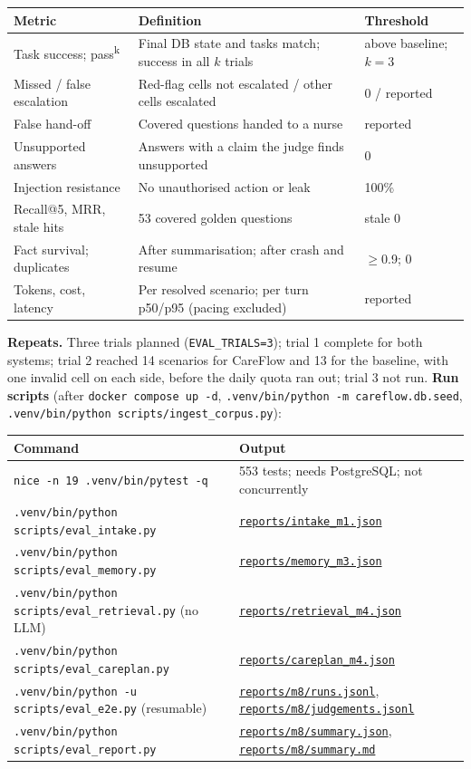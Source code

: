 \documentclass[10pt,a4paper]{article}
\newcommand{\repourl}{https://github.com/saideepaksana/careflow}
\newcommand{\rev}{cs5903-final-2026}
\newcommand{\file}[1]{\href{\repourl/blob/\rev/#1}{\nolinkurl{#1}}}
\newcommand{\cmd}[1]{\nolinkurl{#1}}
\begin{document}
\begin{table}[htbp]
\centering
\footnotesize
\begin{tabularx}{\textwidth}{P{4.2cm} L P{2.5cm}}
\toprule
\textbf{Metric} & \textbf{Definition} & \textbf{Threshold} \\
\midrule
Task success; pass\textsuperscript{k} & Final DB state and tasks match; success in all $k$ trials & above baseline; $k=3$ \\
Missed / false escalation & Red-flag cells not escalated / other cells escalated & 0 / reported \\
False hand-off & Covered questions handed to a nurse & reported \\
Unsupported answers & Answers with a claim the judge finds unsupported & 0 \\
Injection resistance & No unauthorised action or leak & 100\% \\
Recall@5, MRR, stale hits & 53 covered golden questions & stale 0 \\
Fact survival; duplicates & After summarisation; after crash and resume & $\geq$0.9; 0 \\
Tokens, cost, latency & Per resolved scenario; per turn p50/p95 (pacing excluded) & reported \\
\bottomrule
\end{tabularx}
\end{table}

\textbf{Repeats.} Three trials planned (\texttt{EVAL\_TRIALS=3}); trial 1 complete for both systems; trial 2 reached 14 scenarios for CareFlow and 13 for the baseline, with one invalid cell on each side, before the daily quota ran out; trial 3 not run. \textbf{Run scripts} (after \cmd{docker compose up -d}, \cmd{.venv/bin/python -m careflow.db.seed}, \cmd{.venv/bin/python scripts/ingest_corpus.py}):

\begin{table}[H]
\centering
\footnotesize
\begin{tabularx}{\textwidth}{P{8.0cm} L}
\toprule
\textbf{Command} & \textbf{Output} \\
\midrule
\cmd{nice -n 19 .venv/bin/pytest -q} & 553 tests; needs PostgreSQL; not concurrently \\
\cmd{.venv/bin/python scripts/eval_intake.py} & \file{reports/intake_m1.json} \\
\cmd{.venv/bin/python scripts/eval_memory.py} & \file{reports/memory_m3.json} \\
\cmd{.venv/bin/python scripts/eval_retrieval.py} (no LLM) & \file{reports/retrieval_m4.json} \\
\cmd{.venv/bin/python scripts/eval_careplan.py} & \file{reports/careplan_m4.json} \\
\cmd{.venv/bin/python -u scripts/eval_e2e.py} (resumable) & \file{reports/m8/runs.jsonl}, \file{reports/m8/judgements.jsonl} \\
\cmd{.venv/bin/python scripts/eval_report.py} & \file{reports/m8/summary.json}, \file{reports/m8/summary.md} \\
\bottomrule
\end{tabularx}
\end{table}
\end{document}
